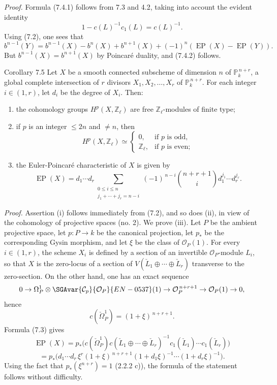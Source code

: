 \emph{Proof.} Formula (7.4.1) follows from 7.3 and 4.2, taking into account the evident identity
\[
1-c(L)^{-1}c_1(L)=c(L)^{-1}.
\]
Using (7.2), one sees that
\[
b^{n-1}(Y)=b^{n-1}(X)-b^n(X)+b^{n+1}(X)+(-1)^n(\operatorname{EP}(X)-\operatorname{EP}(Y)).
\]
But $b^{n-1}(X)=b^{n+1}(X)$ by Poincaré duality, and (7.4.2) follows.

\begin{statement}{Corollary 7.5}
Let $X$ be a smooth connected subscheme of dimension $n$ of $\mathbb P_k^{\,n+r}$, a global complete intersection of $r$ divisors $X_1,X_2,\ldots,X_r$ of $\mathbb P_k^{\,n+r}$. For each integer $i\in(1,r)$, let $d_i$ be the degree of $X_i$. Then:
\begin{enumerate}[label=(\roman*)]
\item the cohomology groups $H^p(X,\mathbb Z_\ell)$ are free $\mathbb Z_\ell$-modules of finite type;
\item if $p$ is an integer $\le 2n$ and $\ne n$, then
\[
H^p(X,\mathbb Z_\ell)\simeq
\begin{cases}
0,&\text{if }p\text{ is odd},\\
\mathbb Z_\ell,&\text{if }p\text{ is even};
\end{cases}
\]
\item the Euler-Poincaré characteristic of $X$ is given by
\[
\operatorname{EP}(X)
=d_1\cdots d_r
\sum_{\substack{0\le i\le n\\ j_1+\cdots+j_r=n-i}}
(-1)^{\,n-i}\binom{n+r+1}{i}
d_1^{j_1}\cdots d_r^{j_r}.
\]
\end{enumerate}
\end{statement}

\emph{Proof.} Assertion (i) follows immediately from (7.2), and so does (ii), in view of the cohomology of projective spaces (no. 2). We prove (iii). Let $P$ be the ambient projective space, let $p:P\to k$ be the canonical projection, let $p_*$ be the corresponding Gysin morphism, and let $\xi$ be the class of $\mathcal O_P(1)$. For every $i\in(1,r)$, the scheme $X_i$ is defined by a section of an invertible $\mathcal O_P$-module $L_i$, so that $X$ is the zero-locus of a section of $V(\check L_1\oplus\cdots\oplus\check L_r)$ transverse to the zero-section. On the other hand, one has an exact sequence
\[
0\to\Omega_P^1\otimes\SGAvar{\mathcal C_p}{\mathcal O_P}{EN-0537}(1)\to\mathcal O_P^{\,n+r+1}\to\mathcal O_P(1)\to0,
\]
hence
\[
c(\check\Omega_P^1)=(1+\xi)^{\,n+r+1}.
\]
Formula (7.3) gives
\[
\operatorname{EP}(X)
=p_*\bigl(c(\check\Omega_P^1)c(\check L_1\oplus\cdots\oplus\check L_r)^{-1}
c_1(\check L_1)\cdots c_1(\check L_r)\bigr)
\]
\[
=p_*\bigl(d_1\cdots d_r\,\xi^r(1+\xi)^{\,n+r+1}
(1+d_1\xi)^{-1}\cdots(1+d_r\xi)^{-1}\bigr).
\]
Using the fact that $p_*(\xi^{n+r})=1$ (2.2.2 c)), the formula of the statement follows without difficulty.

